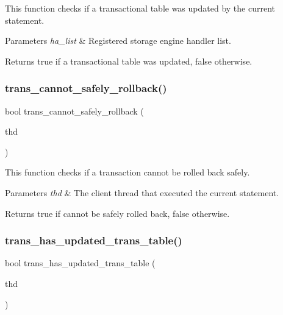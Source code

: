 This function checks if a transactional table was updated by the current statement.


\begin{DoxyParams}{Parameters}
{\em ha\+\_\+list} & Registered storage engine handler list. \\
\hline
\end{DoxyParams}
\begin{DoxyReturn}{Returns}
{\ttfamily true} if a transactional table was updated, {\ttfamily false} otherwise. 
\end{DoxyReturn}
\mbox{\label{group__Binary__Log_ga1d647f955254c565dc33abf8caabdbab}} 
\subsubsection{\texorpdfstring{trans\+\_\+cannot\+\_\+safely\+\_\+rollback()}{trans\_cannot\_safely\_rollback()}}
{\footnotesize\ttfamily bool trans\+\_\+cannot\+\_\+safely\+\_\+rollback (\begin{DoxyParamCaption}\item[{const T\+HD $\ast$}]{thd }\end{DoxyParamCaption})}

This function checks if a transaction cannot be rolled back safely.


\begin{DoxyParams}{Parameters}
{\em thd} & The client thread that executed the current statement. \\
\hline
\end{DoxyParams}
\begin{DoxyReturn}{Returns}
{\ttfamily true} if cannot be safely rolled back, {\ttfamily false} otherwise. 
\end{DoxyReturn}
\mbox{\label{group__Binary__Log_ga25239dc38f22eeef6e1aea243af6fd9a}} 
\subsubsection{\texorpdfstring{trans\+\_\+has\+\_\+updated\+\_\+trans\+\_\+table()}{trans\_has\_updated\_trans\_table()}}
{\footnotesize\ttfamily bool trans\+\_\+has\+\_\+updated\+\_\+trans\+\_\+table (\begin{DoxyParamCaption}\item[{const T\+HD $\ast$}]{thd }\end{DoxyParamCaption})}

